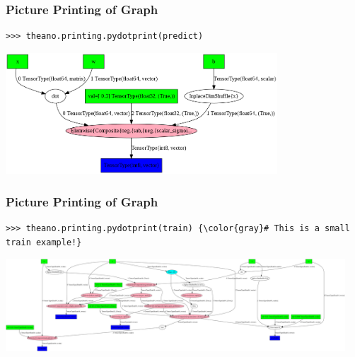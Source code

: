 \documentclass[a4paper,9pt]{beamer}
\begin{document}
\begin{frame}[fragile]
\frametitle{Picture Printing of Graph}
\begin{Verbatim}
>>> theano.printing.pydotprint(predict)
\end{Verbatim}
\includegraphics[width=4in]{pics/logreg_pydotprint_predic.png}
\end{frame}

\begin{frame}[fragile]
\frametitle{Picture Printing of Graph}
\begin{Verbatim}[commandchars=\\\{\}]
>>> theano.printing.pydotprint(train) {\color{gray}# This is a small train example!}
\end{Verbatim}
\hspace{-.8cm}
\includegraphics[width=5.0in]{pics/logreg_pydotprint_train.png}
\end{frame}
\end{document}
